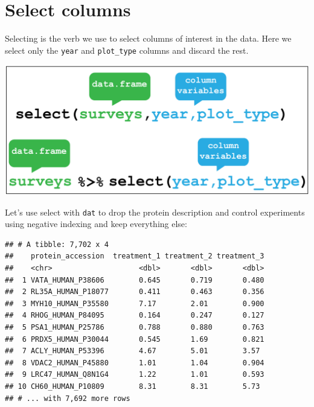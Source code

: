 \documentclass[12pt,]{book}
\newenvironment{Shaded}{\begin{snugshade}}{\end{snugshade}}
\newcommand{\KeywordTok}[1]{\textcolor[rgb]{0.13,0.29,0.53}{\textbf{#1}}}
\newcommand{\DecValTok}[1]{\textcolor[rgb]{0.00,0.00,0.81}{#1}}
\newcommand{\StringTok}[1]{\textcolor[rgb]{0.31,0.60,0.02}{#1}}
\newcommand{\OperatorTok}[1]{\textcolor[rgb]{0.81,0.36,0.00}{\textbf{#1}}}
\newcommand{\NormalTok}[1]{#1}
\theoremstyle{definition}
\theoremstyle{definition}
\theoremstyle{definition}
\theoremstyle{remark}
\begin{document}
\section{Select columns}\label{select-columns}

Selecting is the verb we use to select columns of interest in the data.
Here we select only the \texttt{year} and \texttt{plot\_type} columns
and discard the rest.

\begin{center}\includegraphics[width=0.8\linewidth]{img/dplyr_select} \end{center}

Let's use select with \texttt{dat} to drop the protein description and
control experiments using negative indexing and keep everything else:

\begin{Shaded}
\end{Shaded}

\begin{verbatim}
## # A tibble: 7,702 x 4
##    protein_accession  treatment_1 treatment_2 treatment_3
##    <chr>                    <dbl>       <dbl>       <dbl>
##  1 VATA_HUMAN_P38606        0.645       0.719       0.480
##  2 RL35A_HUMAN_P18077       0.411       0.463       0.356
##  3 MYH10_HUMAN_P35580       7.17        2.01        0.900
##  4 RHOG_HUMAN_P84095        0.164       0.247       0.127
##  5 PSA1_HUMAN_P25786        0.788       0.880       0.763
##  6 PRDX5_HUMAN_P30044       0.545       1.69        0.821
##  7 ACLY_HUMAN_P53396        4.67        5.01        3.57 
##  8 VDAC2_HUMAN_P45880       1.01        1.04        0.904
##  9 LRC47_HUMAN_Q8N1G4       1.22        1.01        0.593
## 10 CH60_HUMAN_P10809        8.31        8.31        5.73 
## # ... with 7,692 more rows
\end{verbatim}
\end{document}

